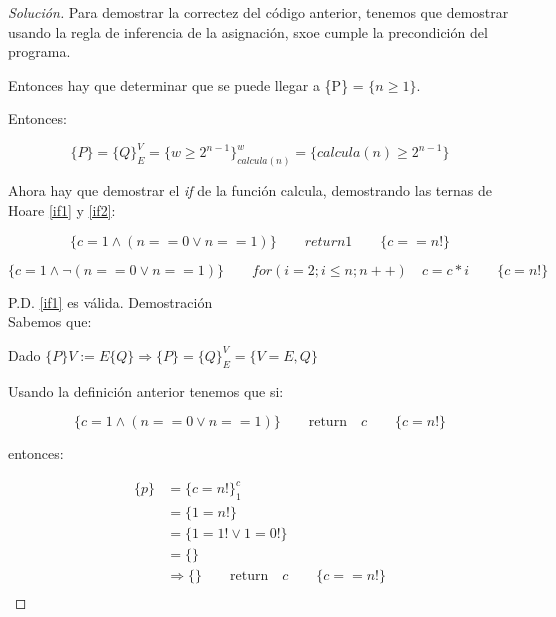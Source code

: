 \begin{proof}[Solución]

  Para demostrar la correctez del código anterior, tenemos que
  demostrar usando la regla de inferencia de la asignación, sxoe cumple
  la precondición del programa.

  Entonces hay que determinar que se puede llegar a \{P\} = $\{n \ge
  1\}$.

  Entonces:

  \begin{equation}
    \label{hoare}
    \{P\} = \{Q\}^V_E = \{w \ge 2^{n-1}\}^w_{calcula(n)} = \{calcula(n)
    \ge 2 ^{n - 1}\}
  \end{equation}

  Ahora hay que demostrar el \textit{if} de la función calcula,
  demostrando las ternas de Hoare \ref{if1} y \ref{if2}:

  \begin{equation}
    \label{if1}
    \{c = 1 \land (n == 0 \lor n == 1)\} \hspace{2em} return 1 \hspace{2em} \{c == n!\}
  \end{equation}

  \begin{equation}
    \label{if2}
   \{c = 1 \land \neg (n == 0 \lor n == 1)\} \hspace{2em} for(i = 2; i \leq n;
   n++)\hspace{1em} c = c * i \hspace{2em}\{c = n!\}
  \end{equation}

  P.D. \ref{if1} es válida. Demostración\\

  Sabemos que:

  Dado $\{P\} V:=E \{Q\} \Rightarrow \{P\} = \{Q\}^V_E = \{V=E, Q\}$

  Usando la definición anterior tenemos que si:

  \begin{equation*}
    \{c = 1 \land (n == 0 \lor n == 1)\} \hspace{2em} \text{return}\hspace{1em} c
    \hspace{2em} \{c = n!\}
  \end{equation*}

  entonces:

  \begin{equation*}
    \begin{split}
      \{p\} &= \{c = n!\}^c_1\\
      & = \{1 = n!\}\\
      & = \{1 = 1! \lor 1 = 0!\}\\
      & = \{\}\\
      & \Rightarrow \{\} \hspace{2em} \text{return}\hspace{1em} c\hspace{2em} \{c == n!\}\\
    \end{split}
  \end{equation*}


\end{proof}
